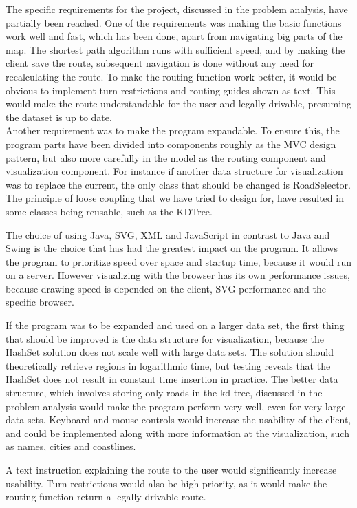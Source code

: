 \documentclass[a4paper,10pt,titlepage]{article}
\begin{document}
The specific requirements for the project, discussed in the problem analysis, have partially been reached. One of the requirements was making the basic functions work well and fast, which has been done, apart from navigating big parts of the map. The shortest path algorithm runs with sufficient speed, and by making the client save the route, subsequent navigation is done without any need for recalculating the route. To make the routing function work better, it would be obvious to implement turn restrictions and routing guides shown as text. This would make the route understandable for the user and legally drivable, presuming the dataset is up to date.\\

Another requirement was to make the program expandable. To ensure this, the program parts have been divided into components roughly as the MVC design pattern, but also more carefully in the model as the routing component and visualization component. For instance if another data structure for visualization was to replace the current, the only class that should be changed is RoadSelector. The principle of loose coupling that we have tried to design for, have resulted in some classes being reusable, such as the KDTree.

The choice of using Java, SVG, XML and JavaScript in contrast to Java and Swing is the choice that has had the greatest impact on the program. It allows the program to prioritize speed over space and startup time, because it would run on a server. However visualizing with the browser has its own performance issues, because drawing speed is depended on the client, SVG performance and the specific browser.

If the program was to be expanded and used on a larger data set, the first thing that should be improved is the data structure for visualization, because the HashSet solution does not scale well with large data sets. The solution should theoretically retrieve regions in logarithmic time, but testing reveals that the HashSet does not result in constant time insertion in practice. The better data structure, which involves storing only roads in the kd-tree, discussed in the problem analysis would make the program perform very well, even for very large data sets. Keyboard and mouse controls would increase the usability of the client, and could be implemented along with more information at the visualization, such as names, cities and coastlines.

A text instruction explaining the route to the user would significantly increase usability.  Turn restrictions would also be high priority, as it would make the routing function return a legally drivable route.
 		
\end{document}
